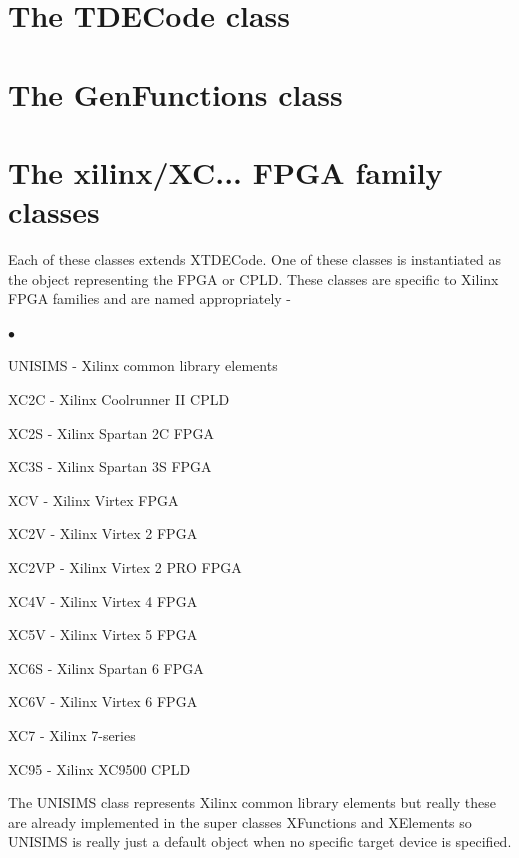 \documentclass[10pt,a4paper,twoside,fleqn]{book}
\newcommand{\blist}{\begin{list}{$\bullet$}{\setlength{\itemsep}{-5pt}\setlength{\topsep}{-5pt}}}
\newcommand{\blend}{\end{list}}
\begin{document}
    \section{The TDECode class}
    
        
        
        
    \section{The GenFunctions class}
    
        
        
    

    \section{The xilinx/XC... FPGA family classes}
    
        Each of these classes extends XTDECode. One of these classes is
        instantiated as the object representing the FPGA or CPLD.
        These classes are specific to Xilinx FPGA families and are
        named appropriately -
        
        \blist
        \item   UNISIMS - Xilinx common library elements
        \item   XC2C - Xilinx Coolrunner II CPLD
        \item   XC2S - Xilinx Spartan 2C FPGA
        \item   XC3S - Xilinx Spartan 3S FPGA
        \item   XCV - Xilinx Virtex FPGA
        \item   XC2V - Xilinx Virtex 2 FPGA
        \item   XC2VP - Xilinx Virtex 2 PRO FPGA
        \item   XC4V - Xilinx Virtex 4 FPGA
        \item   XC5V - Xilinx Virtex 5 FPGA
        \item   XC6S - Xilinx Spartan 6 FPGA
        \item   XC6V - Xilinx Virtex 6 FPGA
        \item   XC7 - Xilinx 7-series
        \item   XC95 - Xilinx XC9500 CPLD
        \blend
        
        The UNISIMS class represents Xilinx common library elements but
        really these are already implemented in the super classes
        XFunctions and XElements so UNISIMS is really just a default
        object when no specific target device is specified.
        
\end{document}
